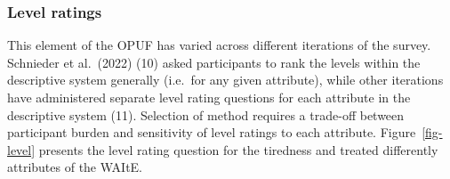 \documentclass[
  letterpaper,
  DIV=11,
  numbers=noendperiod]{scrartcl}
\begin{document}
\subsubsection{Level ratings}\label{level-ratings}

This element of the OPUF has varied across different iterations of the
survey. Schnieder et al.~(2022) (10) asked participants to rank the
levels within the descriptive system generally (i.e.~for any given
attribute), while other iterations have administered separate level
rating questions for each attribute in the descriptive system (11).
Selection of method requires a trade-off between participant burden and
sensitivity of level ratings to each attribute. Figure~\ref{fig-level}
presents the level rating question for the tiredness and treated
differently attributes of the WAItE.
\end{document}
